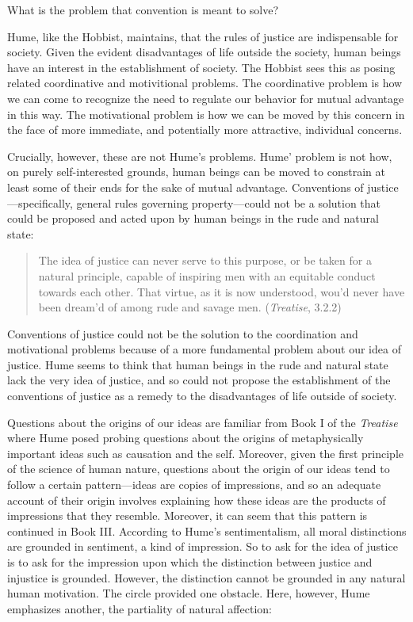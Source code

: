 What is the problem that convention is meant to solve?

Hume, like the Hobbist, maintains, that the rules of justice are indispensable for society. Given the evident disadvantages of life outside the society, human beings have an interest in the establishment of society. The Hobbist sees this as posing related coordinative and motivitional problems. The coordinative problem is how we can come to recognize the need to regulate our behavior for mutual advantage in this way. The motivational problem is how we can be moved by this concern in the face of more immediate, and potentially more attractive, individual concerns.

Crucially, however, these are not Hume's problems. Hume' problem is not how, on purely self-interested grounds, human beings can be moved to constrain at least some of their ends for the sake of mutual advantage. Conventions of justice---specifically, general rules governing property---could not be a solution that could be proposed and acted upon by human beings in the rude and natural state:

\begin{quote}
	The idea of justice can never serve to this purpose, or be taken for a natural principle, capable of inspiring men with an equitable conduct towards each other. That virtue, as it is now understood, wou'd never have been dream'd of among rude and savage men. (\emph{Treatise}, 3.2.2)
\end{quote}

Conventions of justice could not be the solution to the coordination and motivational problems because of a more fundamental problem about our idea of justice. Hume seems to think that human beings in the rude and natural state lack the very idea of justice, and so could not propose the establishment of the conventions of justice as a remedy to the disadvantages of life outside of society.

Questions about the origins of our ideas are familiar from Book I of the \emph{Treatise} where Hume posed probing questions about the origins of metaphysically important ideas such as causation and the self. Moreover, given the first principle of the science of human nature, questions about the origin of our ideas tend to follow a certain pattern---ideas are copies of impressions, and so an adequate account of their origin involves explaining how these ideas are the products of impressions that they resemble. Moreover, it can seem that this pattern is continued in Book III. According to Hume's sentimentalism, all moral distinctions are grounded in sentiment, a kind of impression. So to ask for the idea of justice is to ask for the impression upon which the distinction between justice and injustice is grounded. However, the distinction cannot be grounded in any natural human motivation. The circle provided one obstacle. Here, however, Hume emphasizes another, the partiality of natural affection:

